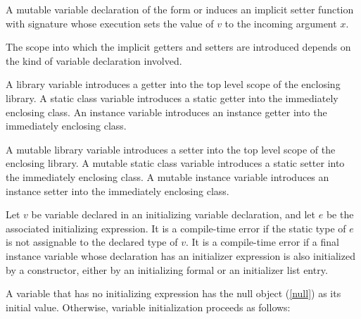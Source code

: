 \documentclass[makeidx]{article}
\begin{document}
\LMHash{}%
A mutable variable declaration of the form
or 
induces an implicit setter function with signature
whose execution sets the value of $v$ to the incoming argument $x$.

\LMHash{}%
The scope into which the implicit getters and setters are introduced depends on the kind of variable declaration involved.

\LMHash{}%
A library variable introduces a getter into the top level scope of the enclosing library.
A static class variable introduces a static getter into the immediately enclosing class.
An instance variable introduces an instance getter into the immediately enclosing class.

\LMHash{}%
A mutable library variable introduces a setter into the top level scope of the enclosing library.
A mutable static class variable introduces a static setter into the immediately enclosing class.
A mutable instance variable introduces an instance setter into the immediately enclosing class.

\LMHash{}%
Let $v$ be variable declared in an initializing variable declaration,
and let $e$ be the associated initializing expression.
It is a compile-time error if the static type of $e$ is not assignable to the declared type of $v$.
It is a compile-time error if a final instance variable whose declaration has an initializer expression
is also initialized by a constructor, either by an initializing formal or an initializer list entry.


\LMHash{}%
A variable that has no initializing expression has the null object (\ref{null}) as its initial value.
Otherwise, variable initialization proceeds as follows:
\end{document}
